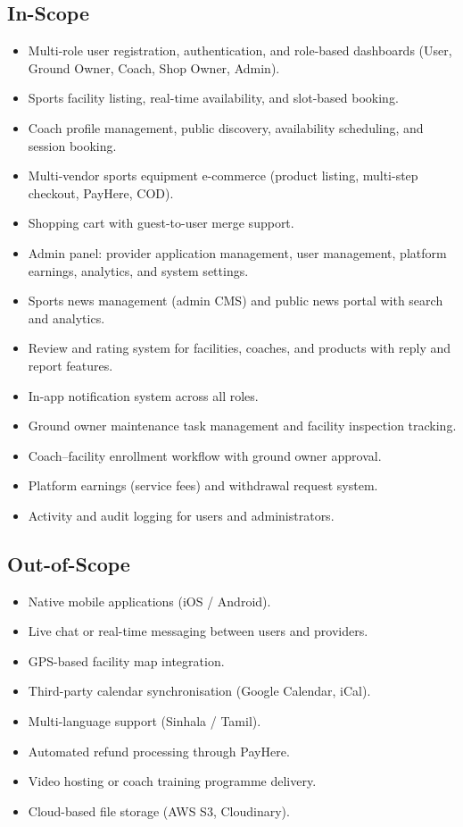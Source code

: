 \documentclass[12pt,a4paper]{report}
\begin{document}
\subsection{In-Scope}
\begin{itemize}[leftmargin=1.5cm]
  \item Multi-role user registration, authentication, and role-based dashboards (User, Ground Owner, Coach, Shop Owner, Admin).
  \item Sports facility listing, real-time availability, and slot-based booking.
  \item Coach profile management, public discovery, availability scheduling, and session booking.
  \item Multi-vendor sports equipment e-commerce (product listing, multi-step checkout, PayHere, COD).
  \item Shopping cart with guest-to-user merge support.
  \item Admin panel: provider application management, user management, platform earnings, analytics, and system settings.
  \item Sports news management (admin CMS) and public news portal with search and analytics.
  \item Review and rating system for facilities, coaches, and products with reply and report features.
  \item In-app notification system across all roles.
  \item Ground owner maintenance task management and facility inspection tracking.
  \item Coach--facility enrollment workflow with ground owner approval.
  \item Platform earnings (service fees) and withdrawal request system.
  \item Activity and audit logging for users and administrators.
\end{itemize}

\subsection{Out-of-Scope}
\begin{itemize}[leftmargin=1.5cm]
  \item Native mobile applications (iOS / Android).
  \item Live chat or real-time messaging between users and providers.
  \item GPS-based facility map integration.
  \item Third-party calendar synchronisation (Google Calendar, iCal).
  \item Multi-language support (Sinhala / Tamil).
  \item Automated refund processing through PayHere.
  \item Video hosting or coach training programme delivery.
  \item Cloud-based file storage (AWS S3, Cloudinary).
\end{itemize}
\end{document}
